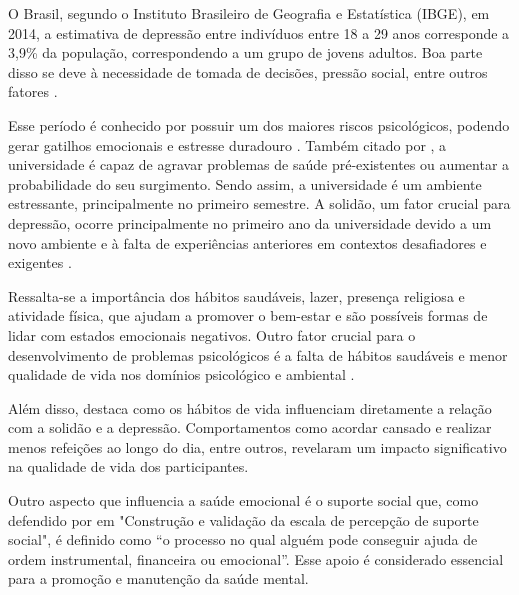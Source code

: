 

O Brasil, segundo o Instituto Brasileiro de Geografia e Estatística (IBGE), em 2014, a estimativa de depressão entre indivíduos entre 18 a 29 anos corresponde a 3,9\% da população, correspondendo a um grupo de jovens adultos. Boa parte disso se deve à necessidade de tomada de decisões, pressão social, entre outros fatores \cite{souza_condicoes_2017}.

Esse período é conhecido por possuir um dos maiores riscos psicológicos, podendo gerar gatilhos emocionais e estresse duradouro \cite{silveira_saumental_2011}. Também citado por , a universidade é capaz de agravar problemas de saúde pré-existentes ou aumentar a probabilidade do seu surgimento. Sendo assim, a universidade é um ambiente estressante, principalmente no primeiro semestre. A solidão, um fator crucial para depressão, ocorre principalmente no primeiro ano da universidade devido a um novo ambiente e à falta de experiências anteriores em contextos desafiadores e exigentes \cite{rhodes_loneliness_2014}.

Ressalta-se a importância dos hábitos saudáveis, lazer, presença religiosa e atividade física, que ajudam a promover o bem-estar e são possíveis formas de lidar com estados emocionais negativos. Outro fator crucial para o desenvolvimento de problemas psicológicos é a falta de hábitos saudáveis e menor qualidade de vida nos domínios psicológico e ambiental \cite{barroso_solidao_2019}.

Além disso,  destaca como os hábitos de vida influenciam diretamente a relação com a solidão e a depressão. Comportamentos como acordar cansado e realizar menos refeições ao longo do dia, entre outros, revelaram um impacto significativo na qualidade de vida dos participantes.

Outro aspecto que influencia a saúde emocional é o suporte social que, como defendido por  em "Construção e validação da escala de percepção de suporte social", é definido como “o processo no qual alguém pode conseguir ajuda de ordem instrumental, financeira ou emocional”. Esse apoio é considerado essencial para a promoção e manutenção da saúde mental.